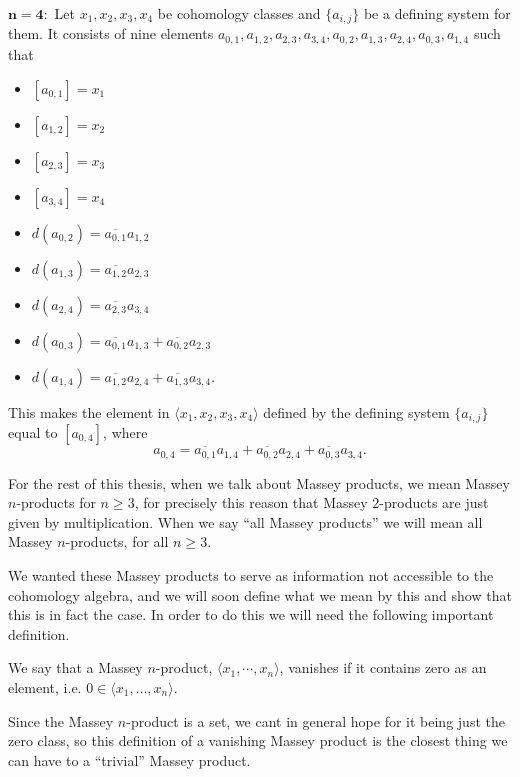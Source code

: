 $\mathbf{n=4}:$ Let $x_1, x_2, x_3, x_4$ be cohomology classes and $\{ a_{i,j} \}$ be a defining system for them. It consists of nine elements $a_{0,1}, a_{1,2}, a_{2,3}, a_{3,4}, a_{0,2}, a_{1,3}, a_{2,4}, a_{0,3}, a_{1,4}$ such that 
\begin{itemize}
    \item $[a_{0,1}] = x_1$
    \item $[a_{1,2}] = x_2$
    \item $[a_{2,3}] = x_3$
    \item $[a_{3,4}] = x_4$
    \item $d(a_{0,2}) = \overline{a_{0,1}} a_{1,2}$
    \item $d(a_{1,3}) = \overline{a_{1,2}} a_{2,3}$
    \item $d(a_{2,4}) = \overline{a_{2,3}} a_{3,4}$
    \item $d(a_{0,3}) = \overline{a_{0,1}} a_{1,3}+\overline{a_{0,2}}a_{2,3}$
    \item $d(a_{1,4}) = \overline{a_{1,2}} a_{2,4}+\overline{a_{1,3}}a_{3,4}$.
\end{itemize}
This makes the element in $\langle x_1, x_2, x_3, x_4\rangle$ defined by the defining system $\{a_{i,j}\}$ equal to $[a_{0,4}]$, where
\begin{equation*}
    a_{0,4} = \overline{a_{0,1}}a_{1,4} + \overline{a_{0,2}}a_{2,4} + \overline{a_{0,3}}a_{3,4}.
\end{equation*}

For the rest of this thesis, when we talk about Massey products, we mean Massey $n$-products for $n\geq 3$, for precisely this reason that Massey $2$-products are just given by multiplication. When we say ``all Massey products'' we will mean all Massey $n$-products, for all $n\geq 3$. 

We wanted these Massey products to serve as information not accessible to the cohomology algebra, and we will soon define what we mean by this and show that this is in fact the case. In order to do this we will need the following important definition. 

\begin{definition}
We say that a Massey $n$-product, $\langle x_1, \cdots, x_n\rangle$, vanishes if it contains zero as an element, i.e. $0\in \langle x_1, \ldots, x_n\rangle$. 
\end{definition}

Since the Massey $n$-product is a set, we cant in general hope for it being just the zero class, so this definition of a vanishing Massey product is the closest thing we can have to a ``trivial'' Massey product. 

